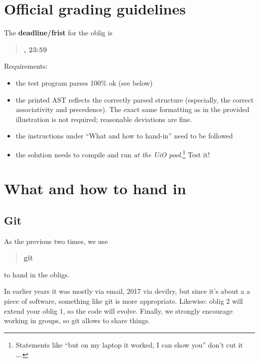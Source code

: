 \documentclass[10pt,freeform]{handout}[2014/08/13]
\begin{document}
\thispagestyle{empty}

\section{Official grading guidelines}
\label{sec:official-info}




\hrulefill{}

The \textbf{deadline/frist}  for the oblig is

\begin{quote}
  \textbf{\deadlineone, 23:59}
\end{quote}

Requirements:


\begin{itemize}
\item the test program parses 100\% ok (see below)
\item the printed AST reflects the correctly parsed structure (especially,
  the correct associativity and precedence). The exact same formatting as
  in the provided illustration is not required; reasonable deviations are
  fine.
\item the instructions under ``What and how to  hand-in'' need to be followed
\item the solution needs to compile and run \emph{at the UiO
    pool}.\footnote{Statements like ``but on my laptop it worked, I can show
    you'' don't cut it \ldots.} Test it!
\end{itemize}

\hrulefill




\section{What and how to hand in}
\label{sec:what-how}


\subsection{Git}
\label{sec:git}



As the previous two times, we use
\begin{quote}
  \textbf{git}   
\end{quote}
to hand in the obligs. 

In earlier years it was mostly via email, 2017 via devilry, but since it's
about a a piece of software, something like git is more
appropriate. Likewise: oblig 2 will extend your oblig 1, so the code will
evolve. Finally, we strongly encourage working in groups, so git allows to
share things.
\end{document}
